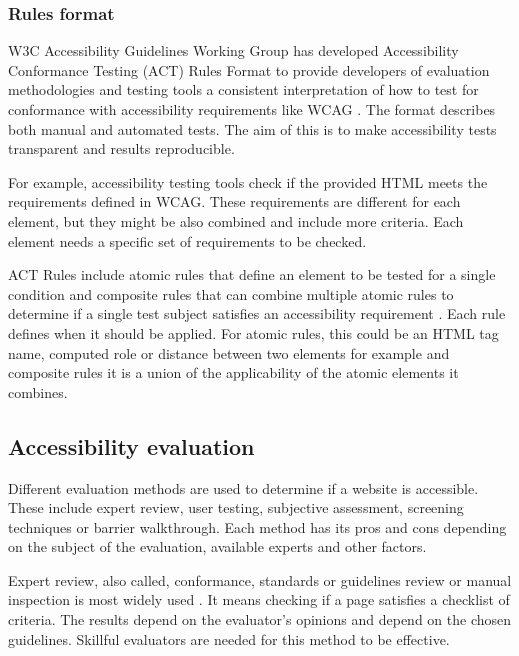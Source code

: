 \documentclass{master_thesis}
\begin{document}
\subsubsection{Rules format}

W3C Accessibility Guidelines Working Group has developed Accessibility Conformance Testing (ACT) Rules Format to provide developers of evaluation methodologies and testing tools a consistent interpretation of how to test for conformance with accessibility requirements like WCAG \citep{Fiers2019}. The format describes both manual and automated tests. The aim of this is to make accessibility tests transparent and results reproducible.

For example, accessibility testing tools check if the provided HTML meets the requirements defined in WCAG. These requirements are different for each element, but they might be also combined and include more criteria. Each element needs a specific set of requirements to be checked.

ACT Rules include atomic rules that define an element to be tested for a single condition and composite rules that can combine multiple atomic rules to determine if a single test subject satisfies an accessibility requirement \citep{Fiers2019}. Each rule defines when it should be applied. For atomic rules, this could be an HTML tag name, computed role or distance between two elements for example and composite rules it is a union of the applicability of the atomic elements it combines.

\subsection{Accessibility evaluation}


Different evaluation methods are used to determine if a website is accessible. These include expert review, user testing, subjective assessment, screening techniques or barrier walkthrough. Each method has its pros and cons depending on the subject of the evaluation, available experts and other factors.

Expert review, also called, conformance, standards or guidelines review or manual inspection is most widely used \citep{Brajnik2008}. It means checking if a page satisfies a checklist of criteria. The results depend on the evaluator's opinions and depend on the chosen guidelines. Skillful evaluators are needed for this method to be effective.
\end{document}
